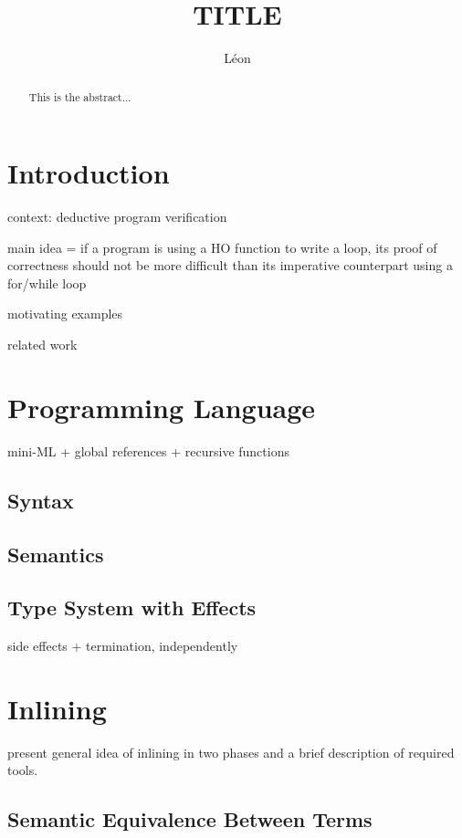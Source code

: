 \documentclass[a4paper,12pt,oneside]{report}
\title{TITLE}
\author{Léon}
\theoremstyle{plain}
\begin{document}
\maketitle

\tableofcontents

\begin{abstract}
  This is the abstract...
\end{abstract}

\chapter{Introduction}

context: deductive program verification~\cite{filliatre11sttt}

main idea = if a program is using a HO function to write a loop, its
proof of correctness should not be more difficult than its imperative
counterpart using a for/while loop

motivating examples

related work 

\chapter{Programming Language}

mini-ML + global references + recursive functions

\section{Syntax}

\section{Semantics}

\section{Type System with Effects}

side effects + termination, independently

\chapter{Inlining}

	present general idea of inlining in two phases and a brief description of 
	required tools.


\section{Semantic Equivalence Between Terms}
\end{document}
